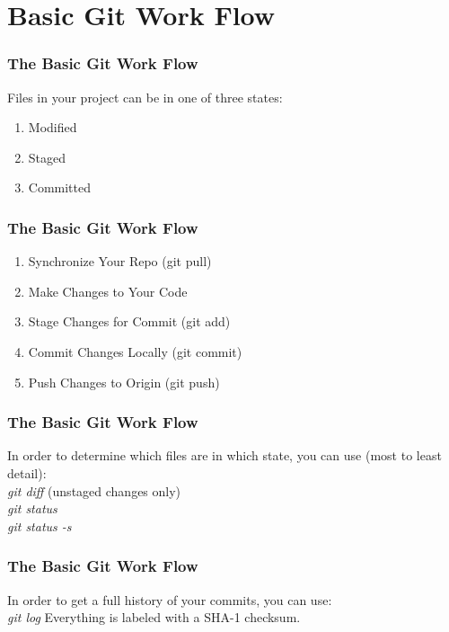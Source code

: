 
\section[Basic Git]{Basic Git Work Flow}

\begin{frame}
\frametitle{\large The Basic Git Work Flow}
Files in your project can be in one of three states:
\begin{enumerate}
\item Modified
\item Staged
\item Committed
\end{enumerate}
\end{frame}

\begin{frame}
\frametitle{\large The Basic Git Work Flow}
\begin{enumerate}
\item Synchronize Your Repo (git pull)
\item Make Changes to Your Code
\item Stage Changes for Commit (git add)
\item Commit Changes Locally (git commit)
\item Push Changes to Origin (git push)
\end{enumerate}
\end{frame}
\note{}

\begin{frame}
\frametitle{\large The Basic Git Work Flow}
In order to determine which files are in which state, you can use (most to least detail): \\
\emph{git diff} (unstaged changes only)\\
\emph{git status} \\
\emph{git status -s}
\end{frame}
\note{}

\begin{frame}
\frametitle{\large The Basic Git Work Flow}
In order to get a full history of your commits, you can use: \\
\emph{git log}
Everything is labeled with a SHA-1 checksum.
\end{frame}
\note{}

